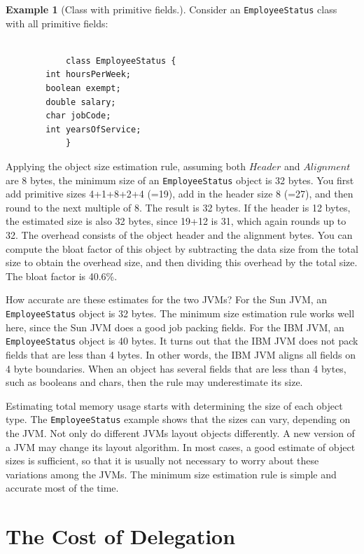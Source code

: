 \documentclass{book}
\theoremstyle{definition}
\newtheorem{example}{Example}
\begin{document}
\begin{example}[Class with primitive fields.]
Consider an \texttt{EmployeeStatus} class with all primitive fields:

\ttfamily
\begin{verbatim} 

			class EmployeeStatus {
        int hoursPerWeek;
        boolean exempt;
        double salary;
        char jobCode;
        int yearsOfService;
			}
\end{verbatim}
\normalfont
Applying the object size estimation rule, assuming both $Header$ and $Alignment$ are 8 bytes, the minimum size of an \texttt{EmployeeStatus} object is 32 bytes. You first add primitive sizes 4+1+8+2+4 (=19), add in the header size 8 (=27), and then round to the next multiple of 8. The result is 32 bytes.  If the header is 12 bytes, the estimated size is also 32 bytes, since 19+12 is 31, which again rounds up to 32. The overhead consists of the object header and the alignment bytes. You can compute the bloat factor of this object by subtracting the data size from the total size to obtain the overhead size, and then dividing this overhead by the total size.  The bloat factor is 40.6\%.

How accurate are these estimates for the two JVMs?  For the Sun JVM, an \texttt{EmployeeStatus} object is 32 bytes. The minimum size estimation rule works well here, since the Sun JVM does a good job packing fields. For the IBM JVM, an \texttt{EmployeeStatus} object is 40 bytes. It turns out that the IBM JVM does not pack fields that are less than 4 bytes. In other words, the IBM JVM aligns all fields on 4 byte boundaries. When an object has several fields that are less than 4 bytes, such as booleans and chars, then the rule may underestimate its size.
			
\end{example}

Estimating total memory usage starts with determining the size of each object type. The \texttt{EmployeeStatus} example shows that the sizes can vary, depending on the JVM. Not only do different JVMs layout objects differently. A new version of a JVM may change its layout algorithm. In most cases, a good estimate of object sizes is sufficient, so that it is usually not necessary to worry about these variations among the JVMs. The minimum size estimation rule is simple and accurate most of the time.

\section{The Cost of Delegation}
\end{document}
